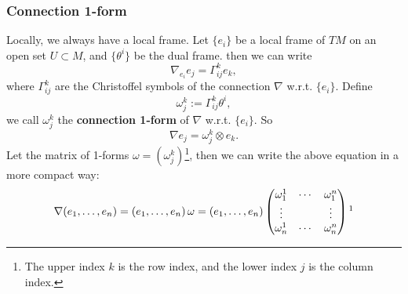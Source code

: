 \subsubsection{Connection 1-form}
Locally, we always have a local frame. Let $\{e_i\}$ be a local frame of $TM$ on an open set $U\subset M$, 
and $\{\theta^i\}$ be the dual frame.
then we can write 
\begin{equation*}
    \nabla_{e_i}e_j = \Gamma_{ij}^k e_k,
\end{equation*}
where $\Gamma_{ij}^k$ are the Christoffel symbols of the connection $\nabla$ w.r.t. $\{e_i\}$. 
Define 
\begin{equation*}
    \omega_j^k := \Gamma_{ij}^k \theta^i,
\end{equation*}
we call $\omega_j^k$ the \textbf{connection 1-form} of $\nabla$ w.r.t. $\{e_i\}$. 
So
\begin{equation*}
    \nabla e_j = \omega_j^k \otimes e_k.
\end{equation*}
Let the matrix of 1-forms $\omega = (\omega_j^k)$\footnote{The upper index $k$ is the row index, 
and the lower index $j$ is the column index.}, 
then we can write the above equation in a more compact way:
\begin{equation*}
    \nabla (\ft{e}{1}{n}) = (\ft{e}{1}{n})\,\omega = 
    (\ft{e}{1}{n})
    \begin{pmatrix}
        \omega_1^1 & \cdots & \omega_1^n \\
        \vdots &  & \vdots \\
        \omega_n^1 & \cdots & \omega_n^n
    \end{pmatrix}\footnotemark
\end{equation*}

